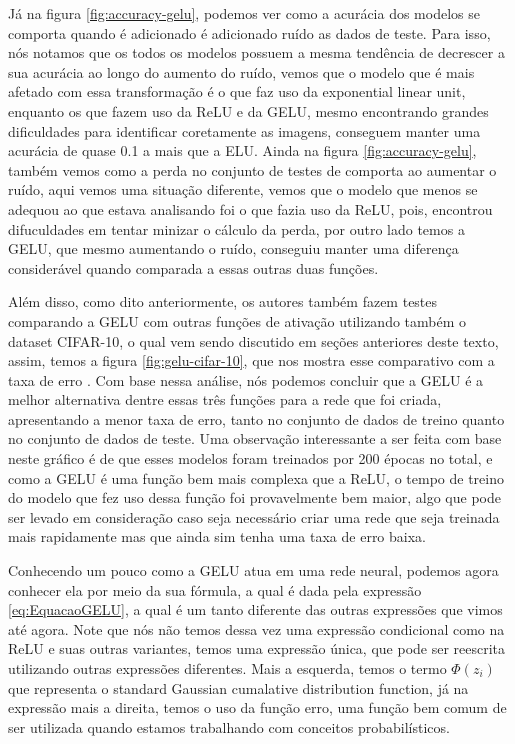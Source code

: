 Já na figura \ref{fig:accuracy-gelu}, podemos ver como a acurácia dos modelos se comporta quando é adicionado é adicionado ruído as dados de teste. Para isso, nós notamos que os todos os modelos possuem a mesma tendência de decrescer a sua acurácia ao longo do aumento do ruído, vemos que o modelo que é mais afetado com essa transformação é o que faz uso da exponential linear unit, enquanto os que fazem uso da ReLU e da GELU, mesmo encontrando grandes dificuldades para identificar coretamente as imagens, conseguem manter uma acurácia de quase 0.1 a mais que a ELU. Ainda na figura \ref{fig:accuracy-gelu}, também vemos como a perda no conjunto de testes de comporta ao aumentar o ruído, aqui vemos uma situação diferente, vemos que o modelo que menos se adequou ao que estava analisando foi o que fazia uso da ReLU, pois, encontrou difuculdades em tentar minizar o cálculo da perda, por outro lado temos a GELU, que mesmo aumentando o ruído, conseguiu manter uma diferença considerável quando comparada a essas outras duas funções.

Além disso, como dito anteriormente, os autores também fazem testes comparando a GELU com outras funções de ativação utilizando também o dataset CIFAR-10, o qual vem sendo discutido em seções anteriores deste texto, assim, temos a figura \ref{fig:gelu-cifar-10}, que nos mostra esse comparativo com a taxa de erro \parencite{GELUArticle}. Com base nessa análise, nós podemos concluir que a GELU é a melhor alternativa dentre essas três funções para a rede que foi criada, apresentando a menor taxa de erro, tanto no conjunto de dados de treino quanto no conjunto de dados de teste. Uma observação interessante a ser feita com base neste gráfico é de que esses modelos foram treinados por 200 épocas no total, e como a GELU é uma função bem mais complexa que a ReLU, o tempo de treino do modelo que fez uso dessa função foi provavelmente bem maior, algo que pode ser levado em consideração caso seja necessário criar uma rede que seja treinada mais rapidamente mas que ainda sim tenha uma taxa de erro baixa.

Conhecendo um pouco como a GELU atua em uma rede neural, podemos agora conhecer ela por meio da sua fórmula, a qual é dada pela expressão \ref{eq:EquacaoGELU}, a qual é um tanto diferente das outras expressões que vimos até agora. Note que nós não temos dessa vez uma expressão condicional como na ReLU e suas outras variantes, temos uma expressão única, que pode ser reescrita utilizando outras expressões diferentes. Mais a esquerda, temos o termo $\Phi(z_i)$ que representa o standard Gaussian cumalative distribution function, já na expressão mais a direita, temos o uso da função erro, uma função bem comum de ser utilizada quando estamos trabalhando com conceitos probabilísticos.

